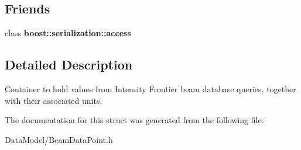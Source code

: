 \subsection*{Friends}
\begin{DoxyCompactItemize}
\item 
\hypertarget{structBeamDataPoint_ac98d07dd8f7b70e16ccb9a01abf56b9c}{
class {\bfseries boost::serialization::access}}
\label{structBeamDataPoint_ac98d07dd8f7b70e16ccb9a01abf56b9c}

\end{DoxyCompactItemize}


\subsection{Detailed Description}
Container to hold values from Intensity Frontier beam database queries, together with their associated units. 

The documentation for this struct was generated from the following file:\begin{DoxyCompactItemize}
\item 
DataModel/BeamDataPoint.h\end{DoxyCompactItemize}
